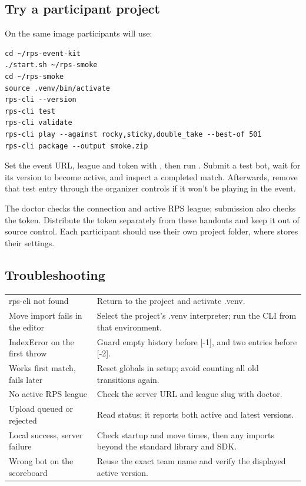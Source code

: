 \documentclass[11pt]{article}
\begin{document}
\subsection*{Try a participant project}

On the same image participants will use:


\begin{lstlisting}[style=shell]
cd ~/rps-event-kit
./start.sh ~/rps-smoke
cd ~/rps-smoke
source .venv/bin/activate
rps-cli --version
rps-cli test
rps-cli validate
rps-cli play --against rocky,sticky,double_take --best-of 501
rps-cli package --output smoke.zip
\end{lstlisting}

Set the event URL, league and token with , then run . Submit a test bot, wait for its version to become active, and inspect a completed match. Afterwards, remove that test entry through the organizer controls if it won't be playing in the event.


The doctor checks the connection and active RPS league; submission also checks the token. Distribute the token separately from these handouts and keep it out of source control. Each participant should use their own project folder, where  stores their settings.


\subsection*{Troubleshooting}

\smallskip\begingroup\small
\setlength{\tabcolsep}{5pt}
\renewcommand{\arraystretch}{1.17}
\begin{tabularx}{\linewidth}{@{}L{.28\linewidth}Y@{}}
\toprule
{} &  \\
\midrule
rps-cli not found & Return to the project and activate .venv. \\
Move import fails in the editor & Select the project's .venv interpreter; run the CLI from that environment. \\
IndexError on the first throw & Guard empty history before [-1], and two entries before [-2]. \\
Works first match, fails later & Reset globals in setup; avoid counting all old transitions again. \\
No active RPS league & Check the server URL and league slug with doctor. \\
Upload queued or rejected & Read status; it reports both active and latest versions. \\
Local success, server failure & Check startup and move times, then any imports beyond the standard library and SDK. \\
Wrong bot on the scoreboard & Reuse the exact team name and verify the displayed active version. \\
\bottomrule
\end{tabularx}\endgroup\par\smallskip
\end{document}
